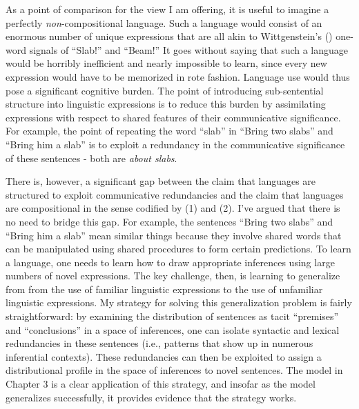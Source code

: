 As a point of comparison for the view I am offering, it is useful to imagine a perfectly \textit{non}-compositional language. Such a language would consist of an enormous number of unique expressions that are all akin to Wittgenstein's (\citeyear{Wittgenstein:1953}) one-word signals of ``Slab!'' and ``Beam!'' It goes without saying that such a language would be horribly inefficient and nearly impossible to learn, since every new expression would have to be memorized in rote fashion. Language use would thus pose a significant cognitive burden. The point of introducing sub-sentential structure into linguistic expressions is to reduce this burden by assimilating expressions with respect to shared features of their communicative significance. For example, the point of repeating the word ``slab'' in ``Bring two slabs'' and ``Bring him a slab'' is to exploit a redundancy in the communicative significance of these sentences - both are \textit{about slabs}. 

There is, however, a significant gap between the claim that languages are structured to exploit communicative redundancies and the claim that languages are compositional in the sense codified by (1) and (2). I've argued that there is no need to bridge this gap. For example, the sentences ``Bring two slabs'' and ``Bring him a slab'' mean similar things because they involve shared words that can be manipulated using shared procedures to form certain predictions. To learn a language, one needs to learn how to draw appropriate inferences using large numbers of novel expressions. The key challenge, then, is learning to generalize from from the use of familiar linguistic expressions to the use of unfamiliar linguistic expressions. My strategy for solving this generalization problem is fairly straightforward: by examining the distribution of sentences as tacit ``premises'' and ``conclusions'' in a space of inferences, one can isolate syntactic and lexical redundancies in these sentences (i.e., patterns that show up in numerous inferential contexts). These redundancies can then be exploited to assign a distributional profile in the space of inferences to novel sentences.  The model in Chapter 3 is a clear application of this strategy, and insofar as the model generalizes successfully, it provides evidence that the strategy works. 

